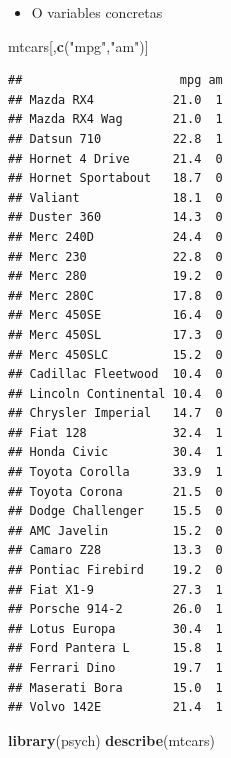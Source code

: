 \documentclass[]{article}
\def\tightlist{}
\newenvironment{Shaded}{\begin{snugshade}}{\end{snugshade}}
\newcommand{\KeywordTok}[1]{\textcolor[rgb]{0.13,0.29,0.53}{\textbf{{#1}}}}
\newcommand{\StringTok}[1]{\textcolor[rgb]{0.31,0.60,0.02}{{#1}}}
\newcommand{\NormalTok}[1]{{#1}}
\numberwithin{equation}{section}
\begin{document}
\begin{itemize}
\tightlist
\item
  O variables concretas
\end{itemize}

\begin{Shaded}
\begin{Highlighting}[]
\NormalTok{mtcars[,}\KeywordTok{c}\NormalTok{(}\StringTok{"mpg"}\NormalTok{,}\StringTok{"am"}\NormalTok{)]}
\end{Highlighting}
\end{Shaded}

\begin{verbatim}
##                      mpg am
## Mazda RX4           21.0  1
## Mazda RX4 Wag       21.0  1
## Datsun 710          22.8  1
## Hornet 4 Drive      21.4  0
## Hornet Sportabout   18.7  0
## Valiant             18.1  0
## Duster 360          14.3  0
## Merc 240D           24.4  0
## Merc 230            22.8  0
## Merc 280            19.2  0
## Merc 280C           17.8  0
## Merc 450SE          16.4  0
## Merc 450SL          17.3  0
## Merc 450SLC         15.2  0
## Cadillac Fleetwood  10.4  0
## Lincoln Continental 10.4  0
## Chrysler Imperial   14.7  0
## Fiat 128            32.4  1
## Honda Civic         30.4  1
## Toyota Corolla      33.9  1
## Toyota Corona       21.5  0
## Dodge Challenger    15.5  0
## AMC Javelin         15.2  0
## Camaro Z28          13.3  0
## Pontiac Firebird    19.2  0
## Fiat X1-9           27.3  1
## Porsche 914-2       26.0  1
## Lotus Europa        30.4  1
## Ford Pantera L      15.8  1
## Ferrari Dino        19.7  1
## Maserati Bora       15.0  1
## Volvo 142E          21.4  1
\end{verbatim}

\begin{Shaded}
\begin{Highlighting}[]
\KeywordTok{library}\NormalTok{(psych)}
\KeywordTok{describe}\NormalTok{(mtcars)}
\end{Highlighting}
\end{Shaded}
\end{document}
